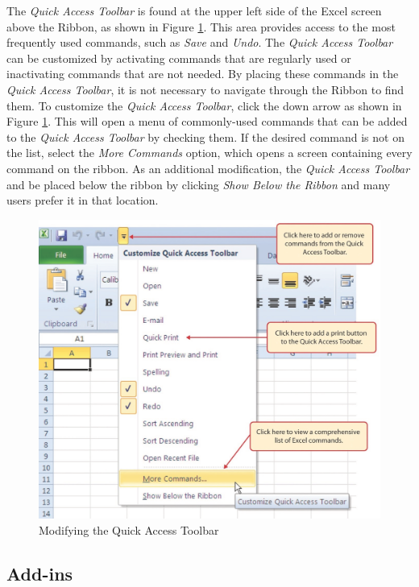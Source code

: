 The \textit{Quick Access Toolbar} is found at the upper left side of the Excel screen above the Ribbon, as shown in Figure \ref{09:fig68}. This area provides access to the most frequently used commands, such as \textit{Save} and \textit{Undo}. The \textit{Quick Access Toolbar} can be customized by activating commands that are regularly used or inactivating commands that are not needed. By placing these commands in the \textit{Quick Access Toolbar}, it is not necessary to navigate through the Ribbon to find them. To customize the \textit{Quick Access Toolbar}, click the down arrow as shown in Figure \ref{09:fig68}. This will open a menu of commonly-used commands that can be added to the \textit{Quick Access Toolbar} by checking them. If the desired command is not on the list, select the \textit{More Commands} option, which opens a screen containing every command on the ribbon. As an additional modification, the \textit{Quick Access Toolbar} and be placed below the ribbon by clicking \textit{Show Below the Ribbon} and many users prefer it in that location.

\begin{figure}[H]
	\centering
	\includegraphics[width=\maxwidth{.75\linewidth}]{gfx/ch09_fig68}
	\caption{Modifying the Quick Access Toolbar}
	\label{09:fig68}
\end{figure}

\subsection{Add-ins}

